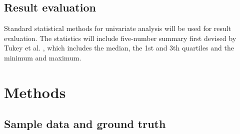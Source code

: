 
\subsection{Result evaluation} \label{subsec:validation} %


Standard statistical methods for univariate analysis will be used for result evaluation. The statistics will include five-number summary first devised by Tukey et al. \cite{tukeyExploratoryDataAnalysis1977a}, which includes the median, the 1st and 3th quartiles and the minimum and maximum.







\section{Methods} \label{sec:casestudy}

\subsection{Sample data and ground truth} \label{subsec:groundtruth}

